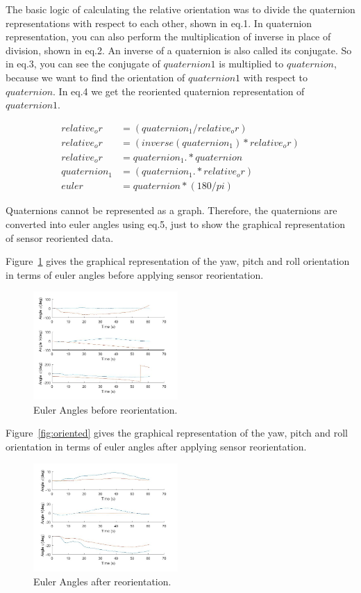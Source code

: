 \documentclass[journal]{IEEEtranTIE}
\begin{document}
The basic logic of calculating the relative orientation was to divide the
quaternion representations with respect to each other, shown in eq.1. In
quaternion representation, you can also perform the multiplication of inverse in
place of division, shown in eq.2. An inverse of a quaternion is also called its
conjugate. So in eq.3, you can see the conjugate of $quaternion1$ is multiplied
to $quaternion$, because we want to find the orientation of $quaternion1$ with
respect to $quaternion$. In eq.4 we get the reoriented quaternion representation
of $quaternion1$.

\begin{align}
  relative_or    &= (quaternion_1 / relative_or)\\
    relative_or  &= (inverse(quaternion_1) * relative_or)\\
  relative_or    &= quaternion_1.* quaternion\\
    quaternion_1 &= (quaternion_1.* relative_or)\\
    euler        &= quaternion*(180/pi)
\end{align}

Quaternions cannot be represented as a graph. Therefore, the quaternions are
converted into euler angles using eq.5, just to show the graphical
representation of sensor reoriented data.

Figure~\ref{fig:nonoriented} gives the graphical representation of the yaw,
pitch and roll orientation in terms of euler angles before applying sensor
reorientation.

\begin{figure}[!t]\centering
  \includegraphics[width=5.5cm]{nonoriented}
  \caption{Euler Angles before reorientation.}\label{fig:nonoriented}
\end{figure}

Figure~\ref{fig:oriented} gives the graphical representation of the yaw, pitch
and roll orientation in terms of euler angles after applying sensor
reorientation.

\begin{figure}[!t]\centering
  \includegraphics[width=5.5cm]{oriented}
  \caption{Euler Angles after reorientation.}\label{fig:orientation}
\end{figure}
\end{document}
